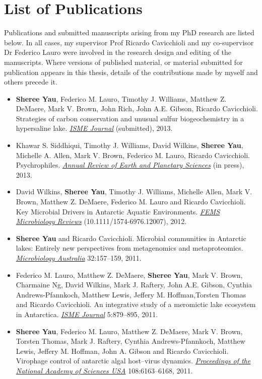 \chapter*{List of Publications}
Publications and submitted manuscripts arising from my PhD research are listed below.
In all cases, my supervisor Prof Ricardo Cavicchioli and my co-supervisor Dr Federico Lauro were
involved in the research design and editing of the manuscripts.
Where versions of published material, or material submitted for publication appears in this thesis, details of the contributions made by myself and others precede it.

\begin{itemize}

\item \textbf{Sheree Yau}, Federico M. Lauro, Timothy J. Williams, Matthew Z. DeMaere, Mark V. Brown, John Rich, John A.E. Gibson, Ricardo Cavicchioli. 
Strategies of carbon conservation and unusual sulfur biogeochemistry in a hypersaline lake.
\emph{\underline{ISME Journal}}
(submitted), 2013.

\item Khawar S. Siddhiqui, Timothy J. Williams, David Wilkins, \textbf{Sheree Yau}, Michelle A. Allen, Mark V. Brown, Federico M. Lauro, Ricardo Cavicchioli.
Psychrophiles.
\emph{\underline{Annual Review of Earth and Planetary }}
\emph{\underline{Sciences}} (in press), 2013.

\item David Wilkins, \textbf{Sheree Yau}, Timothy J. Williams, Michelle Allen, Mark V. Brown, Matthew Z. DeMaere, Federico M. Lauro and Ricardo Cavicchioli.
Key Microbial Drivers in Antarctic Aquatic Environments.
\emph{\underline{FEMS Microbiology Reviews}}
(10.1111/1574-6976.12007), 2012.

\item \textbf{Sheree Yau} and Ricardo Cavicchioli. 
Microbial communities in Antarctic lakes: Entirely new perspectives from metagenomics and metaproteomics. 
\emph{\underline{Microbiology Australia}} 
32:157--159, 2011.

\item Federico M. Lauro, Matthew Z. DeMaere, \textbf{Sheree Yau}, Mark V. Brown, Charmaine Ng, David Wilkins, Mark J. Raftery, John A.E. Gibson, Cynthia Andrews-Pfannkoch, Matthew Lewis, Jeffery M. Hoffman,Torsten Thomas and Ricardo Cavicchioli. 
An integrative study of a meromictic lake ecosystem in Antarctica. 
\emph{\underline{ISME Journal}}
5:879--895, 2011.

\item \textbf{Sheree Yau}, Federico M. Lauro, Matthew Z. DeMaere, Mark V. Brown, Torsten Thomas, 
Mark J. Raftery, Cynthia Andrews-Pfannkoch, Matthew Lewis, Jeffery M. Hoffman, John A. Gibson and 
Ricardo Cavicchioli. 
Virophage control of antarctic algal host--virus dynamics. 
\emph{\underline{Proceedings of the National Academy of Sciences USA}}
108:6163--6168, 2011.

\end{itemize}

